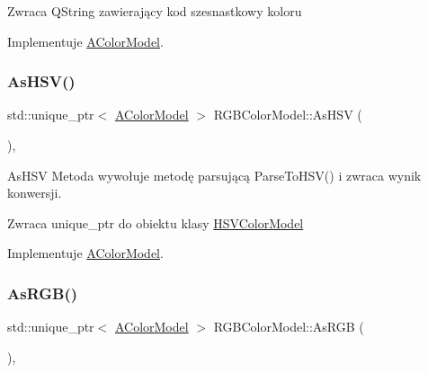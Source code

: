 \begin{DoxyReturn}{Zwraca}
Q\+String zawierający kod szesnastkowy koloru 
\end{DoxyReturn}


Implementuje \mbox{\hyperlink{class_a_color_model}{A\+Color\+Model}}.

\mbox{\label{class_r_g_b_color_model_a18d1b493d34f53ea4fdf9eaa066540c4}} 
\subsubsection{\texorpdfstring{As\+H\+S\+V()}{AsHSV()}}
{\footnotesize\ttfamily std\+::unique\+\_\+ptr$<$ \mbox{\hyperlink{class_a_color_model}{A\+Color\+Model}} $>$ R\+G\+B\+Color\+Model\+::\+As\+H\+SV (\begin{DoxyParamCaption}{ }\end{DoxyParamCaption})\hspace{0.3cm}{\ttfamily [override]}, {\ttfamily [virtual]}}



As\+H\+SV Metoda wywołuje metodę parsującą Parse\+To\+H\+S\+V() i zwraca wynik konwersji. 

\begin{DoxyReturn}{Zwraca}
unique\+\_\+ptr do obiektu klasy \mbox{\hyperlink{class_h_s_v_color_model}{H\+S\+V\+Color\+Model}} 
\end{DoxyReturn}


Implementuje \mbox{\hyperlink{class_a_color_model}{A\+Color\+Model}}.

\mbox{\label{class_r_g_b_color_model_a7619d529d6b0f94287221c813734244d}} 
\subsubsection{\texorpdfstring{As\+R\+G\+B()}{AsRGB()}}
{\footnotesize\ttfamily std\+::unique\+\_\+ptr$<$ \mbox{\hyperlink{class_a_color_model}{A\+Color\+Model}} $>$ R\+G\+B\+Color\+Model\+::\+As\+R\+GB (\begin{DoxyParamCaption}{ }\end{DoxyParamCaption})\hspace{0.3cm}{\ttfamily [override]}, {\ttfamily [virtual]}}



